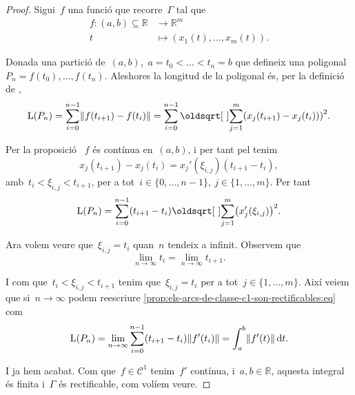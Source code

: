 \documentclass[../../main.tex]{subfiles}
\begin{document}
    \begin{proof}
        Sigui~\(f\) una funció que recorre~\(\Gamma\) tal que
        \begin{align*}
        f\colon(a,b)\subseteq\mathbb{R}&\longrightarrow\mathbb{R}^{m}\\
        t&\longmapsto(x_{1}(t),\dots,x_{m}(t)).
        \end{align*}

        Donada una partició de~\((a,b)\),~\(a=t_{0}<\dots<t_{n}=b\) que defineix una poligonal~\(P_{n}=f(t_{0}),\dots,f(t_{n})\).
        Aleshores la longitud de la poligonal  és, per la definició de ,
        \[
            \Long(P_n)=\sum_{i=0}^{n-1}\norm{f(t_{i+1})-f(t_{i})}=\sum_{i=0}^{n-1}\sqrt{\sum_{j=1}^{m}\left(x_{j}(t_{i+1})-x_{j}(t_{i}))\right)^{2}}.
        \]

        Per la proposició ~\(f\) és contínua en~\((a,b)\), i per tant pel  tenim
        \[
            x_{j}(t_{i+1})-x_{j}(t_{i})=x_{j}'(\xi_{i,j})(t_{i+1}-t_{i}),
        \]
        amb~\(t_{i}<\xi_{i,j}<t_{i+1}\), per a tot~\(i\in\{0,\dots,n-1\},\ j\in\{1,\dots,m\}\).
        Per tant
        \begin{equation}\label{prop:els-arcs-de-classe-c1-son-rectificables:eq}
        \Long(P_{n})=\sum_{i=0}^{n-1}(t_{i+1}-t_{i})\sqrt{\sum_{j=1}^{m}\left(x_{j}'(\xi_{i,j})\right)^2}.
        \end{equation}

        Ara volem veure que~\(\xi_{i,j}=t_{i}\) quan~\(n\) tendeix a infinit.
        Observem que
        \[
            \lim_{n\to\infty}t_{i}=\lim_{n\to\infty}t_{i+1}.
        \]

        I com que~\(t_{i}<\xi_{i,j}<t_{i+1}\) tenim que~\(\xi_{i,j}=t_{i}\) per a tot~\(j\in\{1,\dots,m\}\).
        Així veiem que si~\(n\to\infty\) podem reescriure \eqref{prop:els-arcs-de-classe-c1-son-rectificables:eq} com
        \begin{displaymath}
        \Long(P_{n})=\lim_{n\to\infty}\sum_{i=0}^{n-1}(t_{i+1}-t_{i})\norm{f'(t_{i})}=\int_{a}^{b}\norm{f'(t)}\diff t.
        \end{displaymath}

        I ja hem acabat.
        Com que~\(f\in\mathcal{C}^{1}\) tenim~\(f'\) contínua, i~\(a,b\in\mathbb{R}\), aquesta integral és finita i~\(\Gamma\) és rectificable, com volíem veure.
    \end{proof}
\end{document}

